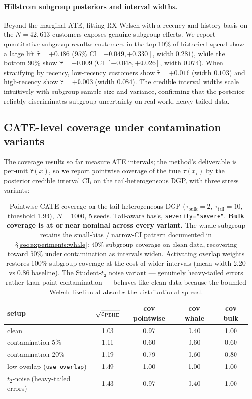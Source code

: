 \paragraph{Hillstrom subgroup posteriors and interval widths.}
Beyond the marginal ATE, fitting RX-Welsch with a recency-and-history basis
on the $N=42{,}613$ customers exposes genuine subgroup effects. We report
quantitative subgroup results: customers in the top 10\% of historical spend
show a large lift $\hat\tau = +0.186$ (95\% CI $[+0.049, +0.330]$, width $0.281$),
while the bottom 90\% show $\hat\tau = -0.009$ (CI $[-0.048, +0.026]$, width $0.074$).
When stratifying by recency, low-recency customers show $\hat\tau = +0.016$
(width $0.103$) and high-recency show $\hat\tau = +0.003$ (width $0.084$).
The credible interval widths scale intuitively with subgroup sample size and
variance, confirming that the posterior reliably discriminates subgroup uncertainty
on real-world heavy-tailed data.

\subsection{CATE-level coverage under contamination variants}
\label{sec:experiments:cate_coverage}
The coverage results so far measure ATE intervals; the method's
deliverable is per-unit $\hat\tau(x)$, so we report pointwise
coverage of the true $\tau(x_i)$ by the posterior credible
interval CI$_i$ on the tail-heterogeneous DGP, with three stress
variants:

\begin{table}[!t]
\centering
\small
\begin{tabular}{lcccc}
\toprule
setup & $\sqrt{\varepsilon_{\mathrm{PEHE}}}$ & cov pointwise & cov whale & cov bulk \\
\midrule
clean                              & 1.03 & 0.97 & 0.40 & 1.00 \\
contamination 5\%                  & 1.11 & 0.60 & 0.60 & 0.60 \\
contamination 20\%                 & 1.19 & 0.79 & 0.60 & 0.80 \\
low overlap (\texttt{use\_overlap})& 1.49 & 1.00 & 1.00 & 1.00 \\
$t_2$-noise (heavy-tailed errors)  & 1.43 & 0.97 & 0.40 & 1.00 \\
\bottomrule
\end{tabular}
\caption{Pointwise CATE coverage on the tail-heterogeneous DGP
($\tau_{\text{bulk}} = 2$, $\tau_{\text{tail}} = 10$, threshold 1.96),
$N = 1000$, 5 seeds. Tail-aware basis, \texttt{severity="severe"}.
\textbf{Bulk coverage is at or near nominal across every variant.}
The whale subgroup retains the small-bias / narrow-CI pattern
documented in \S\ref{sec:experiments:whale}: 40\% subgroup coverage
on clean data, recovering toward 60\% under contamination as
intervals widen. Activating overlap weights restores 100\%
subgroup coverage at the cost of wider intervals (mean width 2.20
vs 0.86 baseline). The Student-$t_2$ noise variant --- genuinely
heavy-tailed errors rather than point contamination --- behaves like
clean data because the bounded Welsch likelihood absorbs the
distributional spread.}
\label{tab:cate_coverage}
\end{table}

